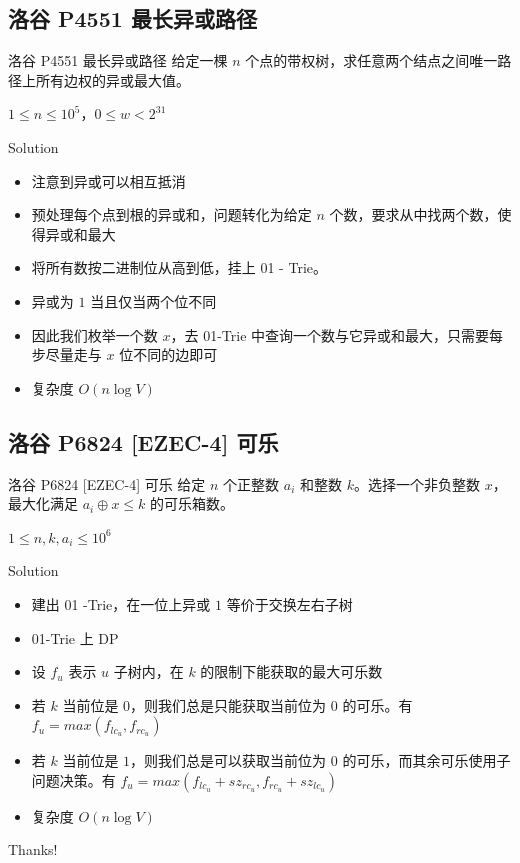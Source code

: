 ﻿\documentclass[aspectratio=169]{ctexbeamer}
\begin{document}
\subsection{洛谷 P4551 最长异或路径}
\begin{frame}{洛谷 P4551 最长异或路径}
    给定一棵 $n$ 个点的带权树，求任意两个结点之间唯一路径上所有边权的异或最大值。
    
    $1\le n\le 10^5$，$0\le w<2^{31}$
\end{frame}
\begin{frame}{Solution}
    \begin{itemize}
        \item 注意到异或可以相互抵消
        \item 预处理每个点到根的异或和，问题转化为给定 $n$ 个数，要求从中找两个数，使得异或和最大
        \item 将所有数按二进制位从高到低，挂上 01 - Trie。
        \item 异或为 $1$ 当且仅当两个位不同
        \item 因此我们枚举一个数 $x$，去 01-Trie 中查询一个数与它异或和最大，只需要每步尽量走与 $x$ 位不同的边即可
        \item 复杂度 $O(n\log V)$
    \end{itemize}
\end{frame}

\subsection{洛谷 P6824 [EZEC-4] 可乐}

\begin{frame}{洛谷 P6824 [EZEC-4] 可乐}
    给定 $n$ 个正整数 $a_i$ 和整数 $k$。选择一个非负整数 $x$，最大化满足 $a_i \oplus x \le k$ 的可乐箱数。
    
    $1\le n,k,a_i\le 10^6$
\end{frame}

\begin{frame}{Solution}
    \begin{itemize}
        \item 建出 01 -Trie，在一位上异或 $ 1 $ 等价于交换左右子树
        \item 01-Trie 上 DP
        \item 设 $f_u$ 表示 $u$ 子树内，在 $k$ 的限制下能获取的最大可乐数
        \item 若 $k$ 当前位是 $ 0 $，则我们总是只能获取当前位为 $0$ 的可乐。有 $f_u=max(f_{lc_u},f_{rc_u})$
        \item 若 $k$ 当前位是 $ 1 $，则我们总是可以获取当前位为 $0$ 的可乐，而其余可乐使用子问题决策。有 $f_u=max(f_{lc_u}+sz_{rc_u},f_{rc_u}+sz_{lc_u})$
        \item 复杂度 $O(n\log V)$
    \end{itemize}
\end{frame}


\begin{frame}
    \begin{center}
        {\Huge\calligra Thanks!}
    \end{center}
\end{frame}
\end{document}

